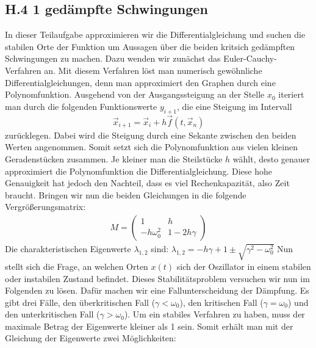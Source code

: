 \documentclass[ngerman]{scrartcl}
\begin{document}
\subsection{H.4 1 gedämpfte Schwingungen}
In dieser Teilaufgabe approximieren wir die Differentialgleichung und suchen die stabilen Orte der Funktion um Aussagen über die beiden kritsich gedämpften Schwingungen zu machen. Dazu wenden wir zunächst das Euler-Cauchy-Verfahren an. Mit diesem Verfahren löst man numerisch gewöhnliche Differentialgleichungen, denn man approximiert den Graphen durch eine Polynomfunktion. Ausgehend von der Ausgangssteigung an der Stelle $x_{0}$ iteriert man durch die folgenden Funktionswerte $y_{i+1}$, die eine Steigung im Intervall 
\begin{equation} \vec{x}_{i+1}=\vec{x}_{i}+h\vec{f}(t,\vec{x}_{n}) \end{equation} 
zurücklegen. Dabei wird die Steigung durch eine Sekante zwischen den beiden Werten angenommen. Somit setzt sich die Polynomfunktion aus vielen kleinen Geradenstücken zusammen. Je kleiner man die Steilstücke $h$ wählt, desto genauer approximiert die Polynomfunktion die Differentialgleichung. Diese hohe Genauigkeit hat jedoch den Nachteil, dass es viel Rechenkapazität, also Zeit braucht. \newline 
Bringen wir nun die beiden Gleichungen in die folgende Vergrößerungsmatrix:
\begin{align}
M=\left(\begin{array}{cc} 1 & h \\ -h\omega_{0}^{2} & 1-2h\gamma \end{array}\right)
\end{align}
Die charakteristischen Eigenwerte $\lambda_{1,2}$ sind: $\lambda_{1,2}=-h\gamma+1\pm\sqrt{\gamma^2-\omega^2_0}$
Nun stellt sich die Frage, an welchen Orten $x(t)$ sich der Oszillator in einem stabilen oder instabilen Zustand befindet. Dieses Stabilitätsproblem versuchen wir nun im Folgenden zu lösen. Dafür machen wir eine Fallunterscheidung der Dämpfung. Es gibt drei Fälle, den überkritischen Fall ($\gamma < \omega_0$), den kritischen Fall ($\gamma = \omega_0$) und den unterkritischen Fall ($\gamma > \omega_0$). Um ein stabiles Verfahren zu haben, muss der maximale Betrag der Eigenwerte kleiner als 1 sein. Somit erhält man mit der Gleichung der Eigenwerte zwei Möglichkeiten: 
\end{document}
